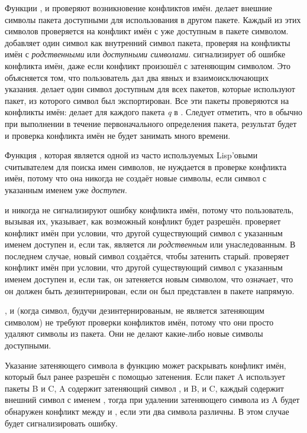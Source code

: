 Функции ,  и  проверяют возникновение
конфликтов имён.  делает внешние символы пакета доступными для
использования в другом пакете. Каждый из этих символов проверяется на конфликт
имён с уже доступным в пакете символом.
 добавляет один символ как внутренний символ пакета, проверяя на
конфликты имён с \emph{родственными} или \emph{доступными
 символами}.  сигнализирует об ошибке конфликта имён, даже если
конфликт произошёл с затеняющим символом. Это объясняется том, что пользователь
дал два явных и взаимоисключающих указания.
 делает один символ доступным для всех пакетов, которые используют
пакет, из которого символ был экспортирован. Все эти пакеты проверяются на
конфликты имён:  делает  для каждого пакета \emph{q} в
. Следует отметить, что в обычно при
выполнении  в течение первоначального определения пакета, результат
 будет {\false} и проверка конфликта имён не будет
занимать много времени.

Функция , которая является одной из часто используемых Lisp'овыми считывателем
для поиска имен символов, не нуждается в проверке конфликта имён, потому что она
никогда не создаёт новые символы, если символ с указанным именем уже
\emph{доступен}. 

 и  никогда не сигнализируют ошибку конфликта
имён, потому что пользователь, вызывая их, указывает, как возможный конфликт
будет разрешён.  проверяет конфликт имён при условии, что другой
существующий символ с указанным именем доступен и, если так, является ли
\emph{родственным} или унаследованным. В последнем случае, новый символ
создаётся, чтобы затенить старый.   проверяет конфликт
имён при условии, что другой существующий символ с указанным именем доступен и,
если так, он затеняется новым символом, что означает, что он должен быть
дезинтернирован, если он был представлен в пакете напрямую.

,  и  (когда символ, будучи
дезинтернированым, не является затеняющим символом) не требуют проверки
конфликтов имён, потому что они просто удаляют символы из пакета. Они не делают
какие-либо новые символы доступными.

Указание затеняющего символа в функцию  может раскрывать конфликт
имён, который был ранее разрешён с помощью затенения. Если пакет A использует
пакеты B и C, A содержит затеняющий символ , и B, и C, каждый содержит
внешний символ с именем , тогда при удалении затеняющего символа 
из A будет обнаружен конфликт между  и , если эти два символа
различны.
В этом случае  будет сигнализировать ошибку.

